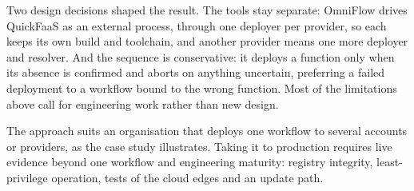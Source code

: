 Two design decisions shaped the result. The tools stay separate: OmniFlow drives QuickFaaS as an
external process, through one deployer per provider, so each keeps its own build and toolchain, and
another provider means one more deployer and resolver. And the sequence is conservative: it deploys a
function only when its absence is confirmed and aborts on anything uncertain, preferring a failed
deployment to a workflow bound to the wrong function. Most of the limitations above call for
engineering work rather than new design.

The approach suits an organisation that deploys one workflow to several accounts or providers, as
the case study illustrates. Taking it to production requires live evidence beyond one workflow and
engineering maturity: registry integrity, least-privilege operation, tests of the cloud edges and
an update path.
